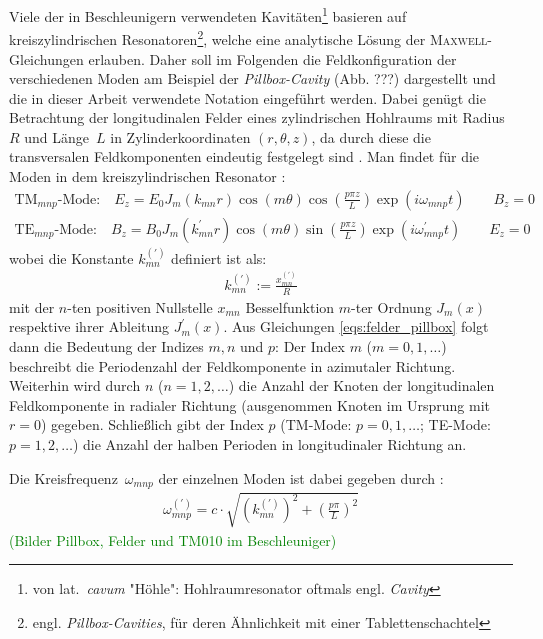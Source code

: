\documentclass[11pt, a4paper]{scrbook}
\newcommand{\todo}[1]{{\textcolor{Green}{(#1)}}}
\begin{document}
	Viele der in Beschleunigern verwendeten Kavitäten\footnote{von lat.\ \emph{cavum} "Höhle": Hohlraumresonator oftmals engl. \emph{Cavity}} basieren auf kreiszylindrischen Resonatoren\footnote{engl. \emph{Pillbox-Cavities}, für deren Ähnlichkeit mit einer Tablettenschachtel}, welche eine analytische Lösung der \textsc{Maxwell}-Gleichungen erlauben.
	Daher soll im Folgenden die Feldkonfiguration der verschiedenen Moden am Beispiel der \emph{Pillbox-Cavity} (Abb. ???) dargestellt und die in dieser Arbeit verwendete Notation eingeführt werden.
	Dabei genügt die Betrachtung der longitudinalen Felder eines zylindrischen Hohlraums mit Radius~$R$ und Länge~$L$ in Zylinderkoordinaten $(r, \theta, z)$, da durch diese die transversalen Feldkomponenten eindeutig festgelegt sind \cite{hillert}.
	Man findet für die Moden in dem kreiszylindrischen Resonator \cite{wangler}:
	\begin{subequations}
		\begin{align}
		\mathrm{TM}_{mnp}\text{-Mode:} \quad E_z = E_0 J_m(k_{mn} r) \cos(m \theta) \cos\left(\frac{p \pi z}{L}\right) \exp(i \omega_{mnp} t) \qquad B_z = 0\\
		\mathrm{TE}_{mnp}\text{-Mode:} \quad B_z = B_0 J_m(k_{mn}^\prime r) \cos(m \theta) \sin\left(\frac{p \pi z}{L}\right) \exp(i \omega_{mnp}^\prime t) \qquad  E_z = 0
		\end{align}
		\label{eqs:felder_pillbox}
	\end{subequations}
	wobei die Konstante $k_{mn}^{(\prime)}$ definiert ist als:
	\begin{align}
	k_{mn}^{(\prime)} := \frac{x_{mn}^{(\prime)}}{R}
	\end{align}
	mit der $n$-ten positiven Nullstelle $x_{mn}$ Besselfunktion $m$-ter Ordnung $J_m(x)$ respektive ihrer Ableitung $J_m^\prime(x)$.
	Aus Gleichungen \eqref{eqs:felder_pillbox} folgt dann die Bedeutung der Indizes $m, n$ und $p$:
	Der Index $m$ ($m=0, 1, \dots$) beschreibt die Periodenzahl der Feldkomponente in azimutaler Richtung.
	Weiterhin wird durch $n$ ($n=1, 2, \dots$) die Anzahl der Knoten der longitudinalen Feldkomponente in radialer Richtung (ausgenommen Knoten im Ursprung mit $r=0$) gegeben.
	Schließlich gibt der Index $p$ (TM-Mode: $p= 0, 1, \dots$; TE-Mode: $p = 1, 2, \dots$) die Anzahl der halben Perioden in longitudinaler Richtung an.
	
	Die Kreisfrequenz~$\omega_{mnp}$ der einzelnen Moden ist dabei gegeben durch \cite{wangler}:
	\begin{align}
	\omega_{mnp}^{(\prime)} = c \cdot \sqrt{\left( k_{mn}^{(\prime)}\right)^2 + \left( \frac{p \pi}{L} \right)^2}
	\end{align}
	\todo{Bilder Pillbox, Felder und TM010 im Beschleuniger}
	
\end{document}
